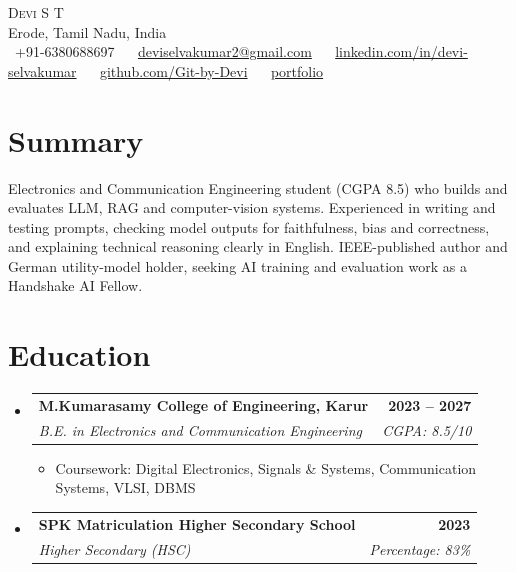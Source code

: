 \documentclass[letterpaper,11pt]{article}
\makeatletter
\newcommand{\resumeItem}[1]{
  \item\small{{#1 \vspace{-2pt}}}
}
\newcommand{\resumeSubheading}[4]{
  \vspace{-3pt}\item
  \begin{tabular*}{1.0\textwidth}[t]{l@{\extracolsep{\fill}}r}
    \textbf{#1} & \textbf{\small #2} \\
    \textit{\small#3} & \textit{\small #4} \\
  \end{tabular*}\vspace{-7pt}
}
\newcommand{\resumeSubHeadingListStart}{\begin{itemize}[leftmargin=0.0in, label={}]}
\newcommand{\resumeSubHeadingListEnd}{\end{itemize}}
\newcommand{\resumeItemListStart}{\begin{itemize}}
\newcommand{\resumeItemListEnd}{\end{itemize}\vspace{-7pt}}
\makeatother
\begin{document}
\begin{center}
    {\Huge \scshape Devi S T} \\ \vspace{1pt}
    Erode, Tamil Nadu, India \\ \vspace{1pt}
    \small
    \faPhone\ +91-6380688697 ~
    \faEnvelope\ \href{mailto:deviselvakumar2@gmail.com}{deviselvakumar2@gmail.com} ~
    \faLinkedin\ \href{https://www.linkedin.com/in/devi-selvakumar}{linkedin.com/in/devi-selvakumar} ~
    \faGithub\ \href{https://github.com/Git-by-Devi}{github.com/Git-by-Devi} ~
    \faGlobe\ \href{https://personal-portfolio-sand-six-18.vercel.app/}{portfolio}
    \vspace{-8pt}
\end{center}

\section{Summary}
\small{
Electronics and Communication Engineering student (CGPA 8.5) who builds and evaluates LLM, RAG and computer-vision systems. Experienced in writing and testing prompts, checking model outputs for faithfulness, bias and correctness, and explaining technical reasoning clearly in English. IEEE-published author and German utility-model holder, seeking AI training and evaluation work as a Handshake AI Fellow.
}

\section{Education}
\resumeSubHeadingListStart
  \resumeSubheading
    {M.Kumarasamy College of Engineering, Karur}{2023 -- 2027}
    {B.E. in Electronics and Communication Engineering}{CGPA: 8.5/10}
    \resumeItemListStart
      \resumeItem{Coursework: Digital Electronics, Signals \& Systems, Communication Systems, VLSI, DBMS}
    \resumeItemListEnd\vspace{6pt}
  \resumeSubheading
    {SPK Matriculation Higher Secondary School}{2023}
    {Higher Secondary (HSC)}{Percentage: 83\%}
\resumeSubHeadingListEnd

\end{document}
